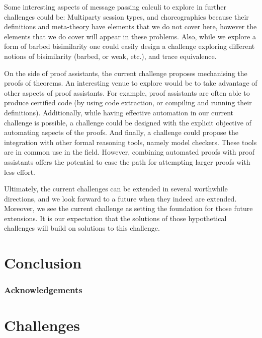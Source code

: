 \documentclass[runningheads]{llncs}
\begin{document}
Some interesting aspects of message passing calculi to explore in
further challenges could be: Multiparty session types, and
choreographies because their definitions and meta-theory have elements
that we do not cover here, however the elements that we do cover will
appear in these problems. Also, while we explore a form of barbed
bisimilarity one could easily design a challenge exploring different
notions of bisimilarity (barbed, or weak, etc.), and trace
equivalence.

On the side of proof assistants, the current challenge proposes
mechanising the proofs of theorems. An interesting venue to explore
would be to take advantage of other aspects of proof assistants. For
example, proof assistants are often able to produce certified code (by
using code extraction, or compiling and running their definitions).
Additionally, while having effective automation in our current
challenge is possible, a challenge could be designed with the explicit
objective of automating aspects of the proofs. And finally, a
challenge could propose the integration with other formal reasoning
tools, namely model checkers. These tools are in common use in the
field. However, combining automated proofs with proof assistants
offers the potential to ease the path for attempting larger proofs
with less effort.

Ultimately, the current challenges can be extended in several
worthwhile directions, and we look forward to a future when they
indeed are extended. Moreover, we see the current challenge as setting
the foundation for those future extensions. It is our expectation that
the solutions of those hypothetical challenges will build on solutions
to this challenge.

\section{Conclusion}\label{sec:conclusion}

\subsubsection*{Acknowledgements}

\appendix
\section{Challenges}\label{app:challenges}




\end{document}
